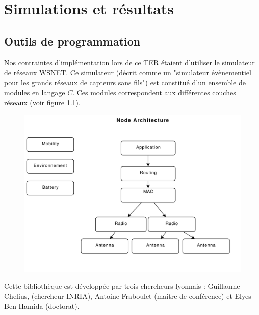 \chapter{Simulations et r\'esultats}\label{simu}

\section{Outils de programmation}
Nos contraintes d'implémentation lors de ce TER étaient d'utiliser le simulateur de réseaux \href{http://wsnet.gforge.inria.fr/}{WSNET}. Ce simulateur (décrit comme un "simulateur évènementiel pour les grands réseaux de capteurs sans fils") est constitué d'un ensemble de modules en langage $C$. Ces modules correspondent aux différentes couches réseaux (voir figure \ref{structWSNET}).
\begin{figure}[h]
\centering
\includegraphics[scale=0.5]{Simus/WSNET.pdf}
\label{structWSNET}
\end{figure}
Cette bibliothèque est développée par trois chercheurs lyonnais : Guillaume Chelius, (chercheur INRIA), Antoine Fraboulet (maitre de conférence) et Elyes Ben Hamida (doctorat).

